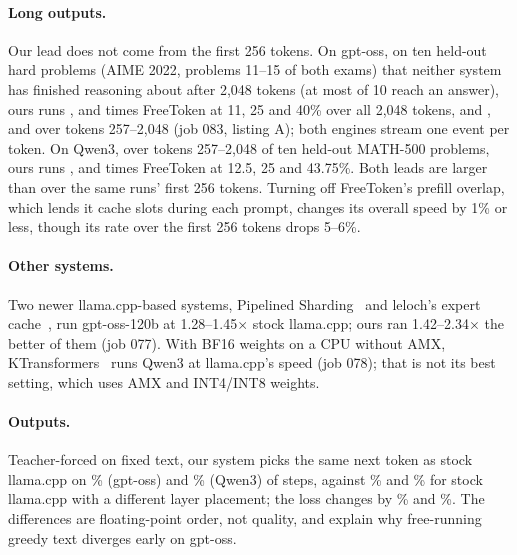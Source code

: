 \documentclass[10pt,twocolumn]{article}
\begin{document}
\paragraph{Long outputs.} Our lead does not come from the first 256 tokens. On gpt-oss, on ten held-out hard
problems (AIME 2022, problems 11--15 of both exams) that neither system has finished reasoning about after 2{,}048
tokens (at most \hardAnsMax{} of 10 reach an answer), ours runs \hardAllA, \hardAllB{} and \hardAllC{} times FreeToken
at 11, 25 and 40\% over all 2{,}048 tokens, and \hardLateA, \hardLateB{} and \hardLateC{} over tokens 257--2{,}048
(job 083, listing A); both engines stream one event per token. On Qwen3, over tokens 257--2{,}048 of ten held-out
MATH-500 problems, ours runs \longQwenA{}, \longQwenB{} and \longQwenC{} times FreeToken at 12.5, 25 and 43.75\%.
Both leads are larger than over the same runs' first 256 tokens. Turning off FreeToken's prefill overlap, which lends
it cache slots during each prompt, changes its overall speed by 1\% or less, though its rate over the first 256 tokens
drops 5--6\%.

\paragraph{Other systems.} Two newer llama.cpp-based systems, Pipelined Sharding~\cite{pipelinedsharding2026} and
leloch's expert cache~\cite{leloch2026}, run gpt-oss-120b at 1.28--1.45$\times$ stock llama.cpp; ours ran 1.42--2.34$\times$
the better of them (job 077). With BF16 weights on a CPU without AMX, KTransformers~\cite{ktransformers} runs Qwen3 at
llama.cpp's speed (job 078); that is not its best setting, which uses AMX and INT4/INT8 weights.

\paragraph{Outputs.} Teacher-forced on fixed text, our system picks the same next token as stock llama.cpp on
\parTopGpt\% (gpt-oss) and \parTopQwen\% (Qwen3) of steps, against \parStockTopGpt\% and \parStockTopQwen\% for stock
llama.cpp with a different layer placement; the loss changes by \parNllGpt\% and \parNllQwen\%. The differences are
floating-point order, not quality, and explain why free-running greedy text diverges early on gpt-oss.
\end{document}
